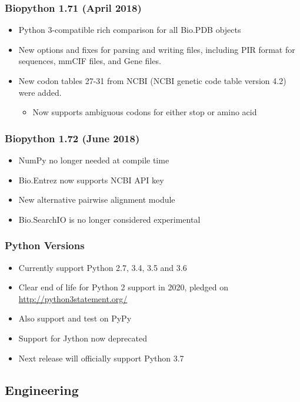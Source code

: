 \begin{frame}
\frametitle{Biopython 1.71 (April 2018)}
\begin{itemize}
   \item Python 3-compatible rich comparison for all Bio.PDB objects
   \item New options and fixes for parsing and writing files, including PIR format for sequences, mmCIF files, and Gene files.
   \item New codon tables 27-31 from NCBI (NCBI genetic code table version 4.2) were added.
       \begin{itemize}
          \item Now supports ambiguous codons for either stop or amino acid
       \end{itemize}
\end{itemize}
\end{frame}

\begin{frame}
\frametitle{Biopython 1.72 (June 2018)}
\begin{itemize}
    \item NumPy no longer needed at compile time
    \item Bio.Entrez now supports NCBI API key
    \item New alternative pairwise alignment module
    \item Bio.SearchIO is no longer considered experimental
\end{itemize}
\end{frame}

\begin{frame}
\frametitle{Python Versions}
\begin{itemize}
\item Currently support Python 2.7, 3.4, 3.5 and 3.6
\item Clear end of life for Python 2 support in 2020, pledged on \url{http://python3statement.org/}
\item Also support and test on PyPy
\item Support for Jython now deprecated
\item Next release will officially support Python 3.7
\end{itemize}
\end{frame}

\subsection{Engineering}


